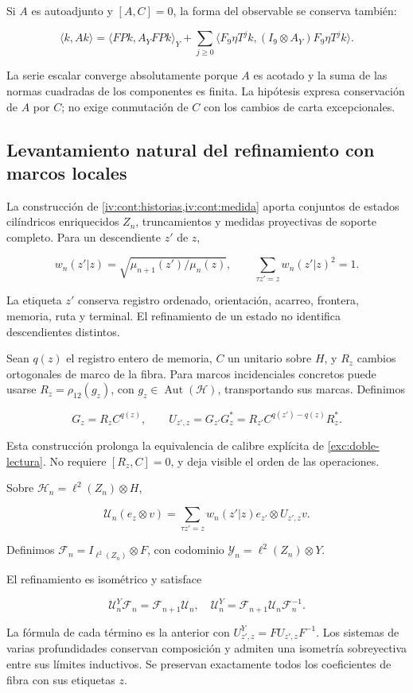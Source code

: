 Si \(A\) es autoadjunto y \([A,C]=0\), la forma del observable se conserva también:

\[
\langle k,Ak\rangle
=\langle FPk,A_YFPk\rangle_Y
+\sum_{j\ge0}\langle F_9\eta T^jk,(I_9\otimes A_Y)F_9\eta T^jk\rangle.
\]

La serie escalar converge absolutamente porque \(A\) es acotado y la suma de las normas cuadradas de los componentes es finita. La hipótesis expresa conservación de \(A\) por \(C\); no exige conmutación de \(C\) con los cambios de carta excepcionales.

\subsection{Levantamiento natural del refinamiento con marcos locales}\label{nuc05:refinamiento}

La construcción de \cref{iv:cont:historias,iv:cont:medida} aporta conjuntos de estados cilíndricos enriquecidos \(Z_n\), truncamientos y medidas proyectivas de soporte completo. Para un descendiente \(z'\) de \(z\),

\[
w_n(z'|z)=\sqrt{\mu_{n+1}(z')/\mu_n(z)},\qquad
\sum_{\tau z'=z}w_n(z'|z)^2=1.
\]

La etiqueta \(z'\) conserva registro ordenado, orientación, acarreo, frontera, memoria, ruta y terminal. El refinamiento de un estado no identifica descendientes distintos.

Sean \(q(z)\) el registro entero de memoria, \(C\) un unitario sobre \(H\), y \(R_z\) cambios ortogonales de marco de la fibra. Para marcos incidenciales concretos puede usarse \(R_z=\rho_{12}(g_z)\), con \(g_z\in\operatorname{Aut}(\mathcal H)\), transportando sus marcas. Definimos

\[
G_z=R_zC^{q(z)},\qquad
U_{z',z}=G_{z'}G_z^*
=R_{z'}C^{q(z')-q(z)}R_z^*.
\]

Esta construcción prolonga la equivalencia de calibre explícita de \cref{exc:doble-lectura}. No requiere \([R_z,C]=0\), y deja visible el orden de las operaciones.

Sobre \(\mathscr H_n=\ell^2(Z_n)\otimes H\),

\[
\mathscr U_n(e_z\otimes v)
=\sum_{\tau z'=z}w_n(z'|z)e_{z'}\otimes U_{z',z}v.
\]

Definimos \(\mathscr F_n=I_{\ell^2(Z_n)}\otimes F\), con codominio \(\mathscr Y_n=\ell^2(Z_n)\otimes Y\).

\begin{theorem}
El refinamiento es isométrico y satisface

\[
\mathscr U^Y_n\mathscr F_n=\mathscr F_{n+1}\mathscr U_n,
\quad
\mathscr U^Y_n=\mathscr F_{n+1}\mathscr U_n\mathscr F_n^{-1}.
\]

La fórmula de cada término es la anterior con \(U^Y_{z',z}=FU_{z',z}F^{-1}\). Los sistemas de varias profundidades conservan composición y admiten una isometría sobreyectiva entre sus límites inductivos. Se preservan exactamente todos los coeficientes de fibra con sus etiquetas \(z\).
\end{theorem}

